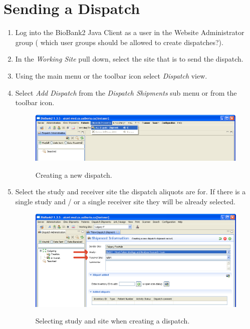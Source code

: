 \section{Sending a Dispatch}
\label{sec:dispatch_send}
\begin{enumerate}
  \item Log into the BioBank2 Java Client as a user in the Website
    Administrator group ({\color{red} which user groups should be allowed to
      create dispatches?}).
  \item In the \emph{Working Site} pull down, select the site that is to send the
    dispatch.
  \item Using the main menu or the toolbar icon select \emph{Dispatch} view.
  \item Select \emph{Add Dispatch} from the \emph{Dispatch Shipments} sub menu
    or from the toolbar icon.
    \begin{figure}[H]
      \centering
      \scalebox{0.5}
      { \includegraphics*{screenshots/dispatch/add} }
      \caption{Creating a new dispatch.}
      \label{fig:dispatch_add}
    \end{figure}
  \item Select the study and receiver site the dispatch aliquots are for. If
    there is a single study and / or a single receiver site they will be
    already selected.
    \begin{figure}[H]
      \centering
      \scalebox{0.5}
      { \includegraphics*{screenshots/dispatch/add_entry} }
      \caption{Selecting study and site when creating a dispatch.}
      \label{fig:dispatch_add_entry}
    \end{figure}

\end{enumerate}
